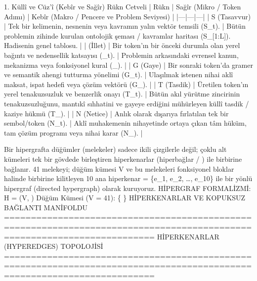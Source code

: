 \documentclass[11pt,a4paper]{article}
\begin{document}
1. Küllî ve Cüz'î (Kebîr ve Sağîr) Rükn Cetveli
| Rükn | Sağîr (Mikro / Token Adımı) | Kebîr (Makro / Pencere ve Problem Seviyesi) |
|---|---|---|
| S (Tasavvur) | Tek bir kelimenin, nesnenin veya kavramın yalın vektör temsili (S_t). | Bütün problemin zihinde kurulan ontolojik şeması / kavramlar haritası (S_{[1:L]}). Hadisenin genel tablosu. |
|  (İllet) | Bir token'ın bir önceki durumla olan yerel bağıntı ve nedensellik katsayısı (_t). | Problemin arkasındaki evrensel kanun, mekanizma veya fonksiyonel kural (_{}). |
| G (Gaye) | Bir sonraki token'da gramer ve semantik ahengi tutturma yönelimi (G_t). | Ulaşılmak istenen nihai aklî maksat, ispat hedefi veya çözüm vektörü (G_{}). |
| T (Tasdik) | Üretilen token'ın yerel tenakuzsuzluk ve benzerlik onayı (T_t). | Bütün akıl yürütme zincirinin tenakuzsuzluğunu, mantıkî sıhhatini ve gayeye erdiğini mühürleyen küllî tasdik / kaziye hükmü (T_{}). |
| N (Netice) | Anlık olarak dışarıya fırlatılan tek bir sembol/token (N_t). | Aklî muhakemenin nihayetinde ortaya çıkan tâm hüküm, tam çözüm programı veya nihai karar (N_{}). |






Bir hipergrafta düğümler (melekeler) sadece ikili çizgilerle değil; çoklu alt kümeleri tek bir gövdede birleştiren hiperkenarlar (hiperbağlar / ) ile birbirine bağlanır.
41 melekeyi; düğüm kümesi V ve bu melekeleri fonksiyonel bloklar halinde birbirine kilitleyen 10 ana hiperkenar  = \{e_1, e_2, \dots, e_{10}\} ile bir yönlü hipergraf (directed hypergraph) olarak kuruyoruz.
HİPERGRAF FORMALİZMİ: H = (V, )
Düğüm Kümesi (\vert{}V\vert{} = 41):
\{  \}
HİPERKENARLAR VE KOPUKSUZ BAĞLANTI MANİFOLDU
========================================================================================================================
                                       HİPERKENARLAR (HYPEREDGES) TOPOLOJİSİ
========================================================================================================================
\end{document}
